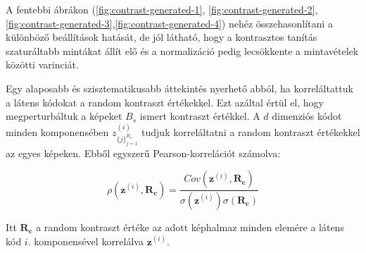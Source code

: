 \documentclass[12pt, english]{article}
\begin{document}
\par A fentebbi ábrákon (\ref{fig:contrast-generated-1}, \ref{fig:contrast-generated-2}, \ref{fig:contrast-generated-3},\ref{fig:contrast-generated-4}) nehéz összehasonlítani a különböző beállítások hatását, de jól látható, hogy a kontrasztos tanítás szaturáltabb mintákat állít elő és a normalizáció pedig lecsökkente a mintavételek közötti varinciát.

\vspace{4mm}

\par Egy alaposabb és szisztematikusabb áttekintés nyerhető abból, ha korreláltattuk a látens kódokat a random kontraszt értékekkel. Ezt azáltal értül el, hogy megperturbáltuk a képeket $B_{s}$ ismert kontraszt értékkel. A $d$ dimenziós kódot minden komponensében $z^{(i)}_{\{j\}_{j = 1}^{B_{s}}}$ tudjuk korreláltatni a random kontraszt értékekkel az egyes képeken. Ebből egyszerű Pearson-korrelációt számolva:

\vspace{4mm}

\begin{equation*}
    \rho(\bm{z}^{(i)}, \bm{R_{c}}) = \frac{Cov(\bm{z}^{(i)}, \bm{R_{c}})}{\sigma(\bm{z}^{(i)})\sigma(\bm{R_{c}})}  
\end{equation*}

\vspace{4mm}



\par Itt $\bm{R_{c}}$ a random kontraszt értéke az adott képhalmaz minden elemére a látens kód $i.$ komponensével korrelálva $\bm{z}^{(i)}$.

\vspace{4mm}
\end{document}
